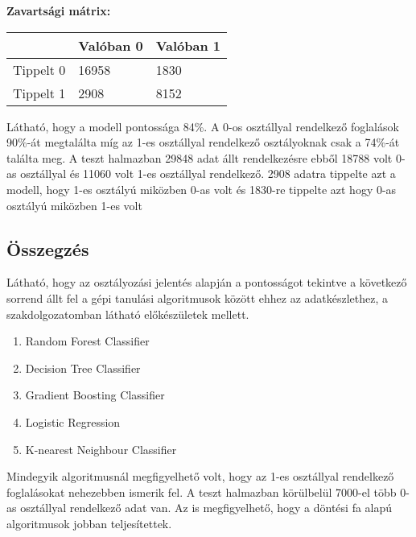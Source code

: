 \textbf{Zavartsági mátrix:}

\begin{tabular}{|l|l|l|}
\hline
          & Valóban 0 & Valóban 1 \\
          \hline
Tippelt 0 & 16958     & 1830     \\
\hline
Tippelt 1 & 2908      & 8152    \\
\hline
\end{tabular}

Látható, hogy a modell pontossága 84\%. A 0-os osztállyal rendelkező foglalások 90\%-át megtalálta míg az 1-es osztállyal rendelkező osztályoknak csak a 74\%-át találta meg. A teszt halmazban 29848 adat állt rendelkezésre ebből 18788 volt 0-as osztállyal és 11060 volt 1-es osztállyal rendelkező. 2908 adatra tippelte azt a modell, hogy 1-es osztályú miközben 0-as volt és 1830-re tippelte azt hogy 0-as osztályú miközben 1-es volt

\subsection{Összegzés}

Látható, hogy az osztályozási jelentés alapján a pontosságot tekintve a következő sorrend állt fel a gépi tanulási algoritmusok között ehhez az adatkészlethez, a szakdolgozatomban látható előkészületek mellett.
\begin{enumerate}
    \item Random Forest Classifier
    \item Decision Tree Classifier
    \item Gradient Boosting Classifier
    \item Logistic Regression
    \item K-nearest Neighbour Classifier
\end{enumerate}

Mindegyik algoritmusnál megfigyelhető volt, hogy az 1-es osztállyal rendelkező foglalásokat nehezebben ismerik fel. A teszt halmazban körülbelül 7000-el több 0-as osztállyal rendelkező adat van. Az is megfigyelhető, hogy a döntési fa alapú algoritmusok jobban teljesítettek.
